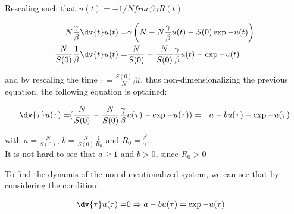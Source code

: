Rescaling such that $u(t) = - 1/N frac{\beta}{\gamma} R(t)$ 

\begin{align*}
N \frac{\gamma}{\beta}\dv{t} u(t) =& \gamma \left(N - N \frac{\gamma}{\beta} u(t) - S(0) \exp { -  u(t) } \right) \\
\frac{N}{S(0)} \frac{1}{\beta}\dv{t} u(t) =& \frac{N}{S(0)} - \frac{N}{S(0)} \frac{\gamma}{\beta} u(t) - \exp { -u(t) }
\end{align*}

and by rescaling the time $\tau = \frac{S(0)}{N} \beta t$, thus non-dimensionalizing the previous equation, the following equation is optained:

\begin{align*}
\dv{\tau} u(\tau) =& (\frac{N}{S(0)} - \frac{N}{S(0)} \frac{\gamma}{\beta} u(\tau) - \exp { -u(\tau) })
=& a - b u(\tau) - \exp{ -u(\tau) }
\end{align*}

with $a=\frac{N}{S(0)}$, $b = \frac{N}{S(0)} \frac{1}{R_{0}}$ and $R_{0} = \frac{\beta}{\gamma}$. \\
It is not hard to see that $a \geq 1$ and $b>0$, since $R_{0} > 0$

To find the dynamis of the non-dimentionalized system, we can see that by considering the condition:

\begin{align*}
\dv{\tau} u(\tau) =& 0 \Rightarrow a - b u(\tau) = \exp { -u(\tau) }
\end{align*}
